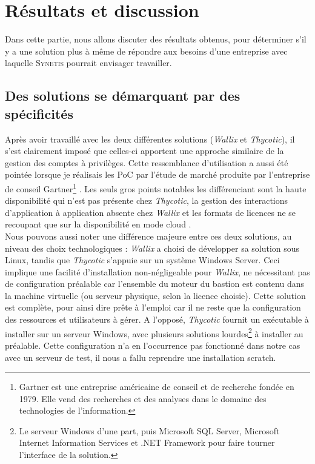 \section{Résultats et discussion}
\label{sec:resultats}

Dans cette partie, nous allons discuter des résultats obtenus, pour déterminer s'il y a une solution plus à même de répondre aux besoins d'une entreprise avec laquelle \textsc{Synetis} pourrait envisager travailler.

\subsection{Des solutions se démarquant par des spécificités}
\label{subsec:soltaille}

Après avoir travaillé avec les deux différentes solutions (\emph{Wallix} et \emph{Thycotic}), il s'est clairement imposé que celles-ci apportent une approche similaire de la gestion des comptes à privilèges. Cette ressemblance d'utilisation a aussi été pointée lorsque je réalisais les PoC par l'étude de marché produite par l'entreprise de conseil Gartner\footnote{Gartner est une entreprise américaine de conseil et de recherche fondée en 1979. Elle vend des recherches et des analyses dans le domaine des technologies de l'information.} \cite{gar}. Les seuls gros points notables les différenciant sont la haute disponibilité qui n'est pas présente chez \emph{Thycotic}, la gestion des interactions d'application à application absente chez \emph{Wallix} et les formats de licences ne se recoupant que sur la disponibilité en mode \og cloud \fg{}.\\
Nous pouvons aussi noter une différence majeure entre ces deux solutions, au niveau des choix technologiques : \emph{Wallix} a choisi de développer sa solution sous Linux, tandis que \emph{Thycotic} s'appuie sur un système Windows Server. Ceci implique une facilité d'installation non-négligeable pour \emph{Wallix}, ne nécessitant pas de configuration préalable car l'ensemble du moteur du bastion est contenu dans la machine virtuelle (ou serveur physique, selon la licence choisie). Cette solution est complète, pour ainsi dire \og prête à l'emploi \fg{} car il ne reste que la configuration des ressources et utilisateurs à gérer. A l'opposé, \emph{Thycotic} fournit un exécutable à installer sur un serveur Windows, avec plusieurs solutions lourdes\footnote{Le serveur Windows d'une part, puis Microsoft SQL Server, Microsoft Internet Information Services et .NET Framework pour faire tourner l'interface de la solution.} à installer au préalable. Cette configuration n'a en l'occurrence pas fonctionné dans notre cas avec un serveur de test, il nous a fallu reprendre une installation \gls{scratch}.\\
